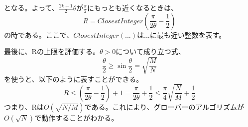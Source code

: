 
となる。よって、$\frac{2k + 1}{2}\theta$が$\frac{\pi}{2}$にもっとも近くなるときは、
\begin{equation}
    R = ClosestInteger(\frac{\pi}{2\theta} - \frac{1}{2})
\end{equation}
の時である。ここで、$ClosestInteger(...)$は$...$に最も近い整数を表す。

最後に、Rの上限を評価する。$\theta > 0$について成り立つ式、
\begin{equation}
    \frac{\theta}{2} \geq \sin{\frac{\theta}{2}} = \sqrt{\frac{M}{N}}
\end{equation}
を使うと、以下のように表すことができる。
\begin{equation}
    R \leq \left( \frac{\pi}{2\theta} - \frac{1}{2} \right) + 1 = \frac{\pi}{2\theta} + \frac{1}{2} \leq \frac{\pi}{4}\sqrt{\frac{N}{M}} + \frac{1}{2}
\end{equation}
つまり、Rは$O(\sqrt{N/M})$である。これにより、グローバーのアルゴリズムが$O(\sqrt{N})$で動作することがわかる。
